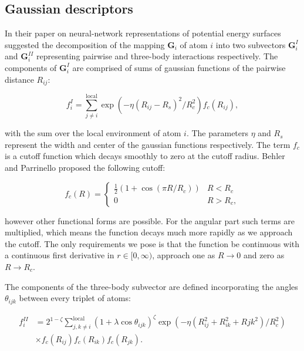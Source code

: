 \subsection{Gaussian descriptors}
In their paper on neural-network representations of
potential energy surfaces \parencite[Behler, J\"{o}rg and
Parrinello, Michele]{behler2007generalized}
suggested the decomposition of the mapping $\bm{G}_i$ of atom $i$
into two subvectors $\bm{G}_i^I$ and $\bm{G}_i^{II}$ representing
pairwise and three-body interactions respectively.
The components of $\bm{G}_i^I$ are comprised of
sums of gaussian functions of the pairwise distance $R_{ij}$:

\begin{equation}
 f_i^I = \sum_{j \neq i}^{\text{local}}
    \exp \left( -\eta(R_{ij} - R_s)^2 / R_c^2 \right) f_c (R_{ij}) , 
\end{equation}

with the sum over the local environment of atom $i$.
The parameters $\eta$ and $R_s$ represent the width and center
of the gaussian functions respectively. The term $f_c$
is a cutoff function which decays smoothly to zero
at the cutoff radius. Behler and Parrinello proposed
the following cutoff:

\begin{equation}
    f_c(R) =
\begin{cases}
    \frac{1}{2}\left(1 + \cos \left(\pi R / R_c \right) \right) & R < R_c \\
    0 & R > R_c ,
\end{cases}
\end{equation}

however other functional forms are possible. For the angular part
such terms are multiplied, which means the function decays much more
rapidly as we approach the cutoff. The only requirements we pose
is that the function be continuous with a continuous first derivative
in $r \in [0, \infty)$,
approach one as $R \rightarrow 0$
and zero as $R \rightarrow R_c$.
\par
The components of the three-body subvector are defined incorporating
the angles $\theta_{ijk}$ between every triplet of atoms:

\begin{equation}
\begin{split}
    f_i^{II} &= 2^{1 - \zeta} \sum_{j,k \neq i}^{\text{local}}
    (1 + \lambda \cos \theta_{ijk})^{\zeta}
    \exp \left( -\eta \left( R_{ij}^2 + R_{ik}^2 + R{jk}^2
    \right) / R_c^2 \right) \\
    & \times f_c(R_{ij}) f_c(R_{ik}) f_c(R_{jk}) .
\end{split}
\end{equation}

